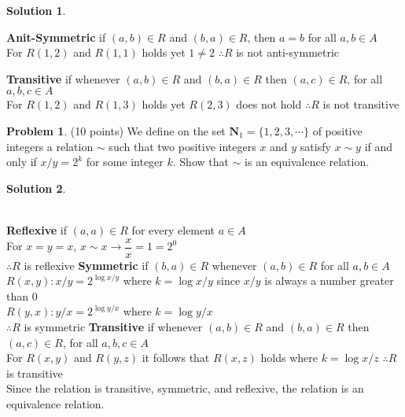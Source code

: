 \documentclass{article}
\theoremstyle{definition}
\newtheorem{problem}{Problem}
\newtheorem*{solution}{Solution}
\newcommand{\N}{\mathbf{N}}
\begin{document}
\begin{solution}
\begin{enumerate}[label=(\alph*)]
      \textbf{Anit-Symmetric} if $(a,b) \in R$ and $(b,a) \in R$, then $a=b$ for all $a,b \in A$ \\
      For $R(1,2)$ and $R(1,1)$ holds yet $1 \neq 2$
      $\therefore R$ is not anti-symmetric 
    
      \textbf{Transitive} if whenever $(a,b) \in R$ and $(b,a) \in R$ then $(a,c) \in R$, for all $a,b,c \in A$ \\
      For $R(1,2)$ and $R(1,3)$ holds yet $R(2,3)$ does not hold
      $\therefore R$ is not transitive

  \end{enumerate}
\end{solution}

\begin{problem} (10 points)
We define on the set $\N_1=\{1,2,3,\cdots\}$ of positive integers a
relation $\sim$ such that two positive integers $x$ and $y$ satisfy
$x\sim y$ if and only if $x/y=2^k$ for some integer $k$. 
Show that $\sim$ is an equivalence relation.
\end{problem}
\begin{solution} 
\end{solution} \ \\
      \textbf{Reflexive} if $(a,a) \in R$ for every element $a \in A$ \\
      For $x = y = x$, $x \sim x \rightarrow \dfrac{x}{x} = 1 = 2^0$ \\
      $\therefore R$ is reflexive
      \textbf{Symmetric} if $(b,a) \in R$ whenever $(a,b) \in R$ for all $a,b \in A$ \\
       $R(x,y): x/y = 2^{\log x/y}$ where $k = \log x/y$ since $x/y$ is always a number greater than 0 \\
       $R(y,x): y/x = 2^{\log y/x}$ where $k = \log y/x$ \\
      $\therefore R$ is symmetric
      \textbf{Transitive} if whenever $(a,b) \in R$ and $(b,a) \in R$ then $(a,c) \in R$, for all $a,b,c \in A$ \\
      For $R(x,y)$ and $R(y,z)$ it follows that $R(x,z)$ holds where $k = \log x/z$
      $\therefore R$ is transitive \\
      Since the relation is transitive, symmetric, and reflexive, the relation is an equivalence relation.
\end{document}
